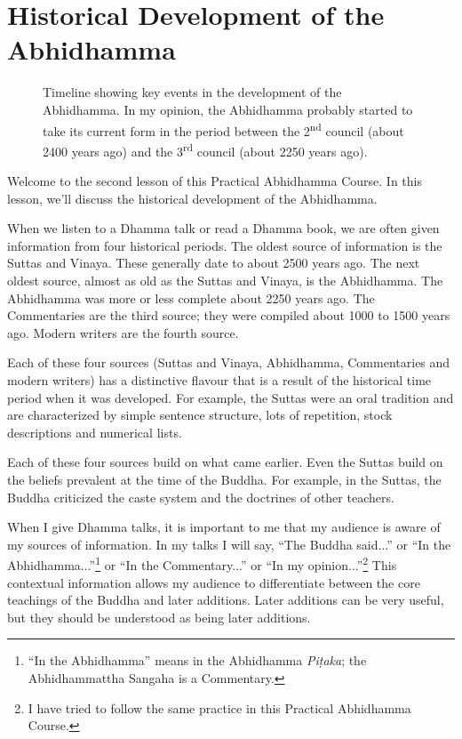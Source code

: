 \section{Historical Development of the Abhidhamma}

\begin{figure}[h]
\centering

\caption{Timeline showing key events in the development of the Abhidhamma. In my opinion, the Abhidhamma probably started to take its current form in the period between the 2\textsuperscript{nd} council (about 2400 years ago) and the 3\textsuperscript{rd} council (about 2250 years ago).}
\label{fig:Timeline}
\end{figure}

Welcome to the second lesson of this Practical Abhidhamma Course. In this lesson, we'll discuss the historical development of the Abhidhamma.

When we listen to a Dhamma talk or read a Dhamma book, we are often given information from four historical periods. The oldest source of information is the Suttas and Vinaya. These generally date to about 2500 years ago. The next oldest source, almost as old as the Suttas and Vinaya, is the Abhidhamma. The Abhidhamma was more or less complete about 2250 years ago. The Commentaries are the third source; they were compiled about 1000 to 1500 years ago. Modern writers are the fourth source. 

Each of these four sources (Suttas and Vinaya, Abhidhamma, Commentaries and modern writers) has a distinctive flavour that is a result of the historical time period when it was developed. For example, the Suttas were an oral tradition and are characterized by simple sentence structure, lots of repetition, stock descriptions and numerical lists. 

Each of these four sources build on what came earlier. Even the Suttas build on the beliefs prevalent at the time of the Buddha. For example, in the Suttas, the Buddha criticized the caste system and the doctrines of other teachers. 

When I give Dhamma talks, it is important to me that my audience is aware of my sources of information. In my talks I will say, “The Buddha said...” or “In the Abhidhamma...”\footnote{“In the Abhidhamma” means in the Abhidhamma \textit{Piṭaka}; the Abhidhammattha Sangaha is a Commentary.} or “In the Commentary...” or “In my opinion...”\footnote{I have tried to follow the same practice in this Practical Abhidhamma Course.} This contextual information allows my audience to differentiate between the core teachings of the Buddha and later additions. Later additions can be very useful, but they should be understood as being later additions.


